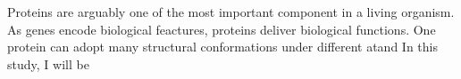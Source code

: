 Proteins are arguably one of the most important component in a living organism. As genes encode biological feactures, proteins deliver biological functions. One protein can adopt many structural conformations under different atand   In this study, I will be 